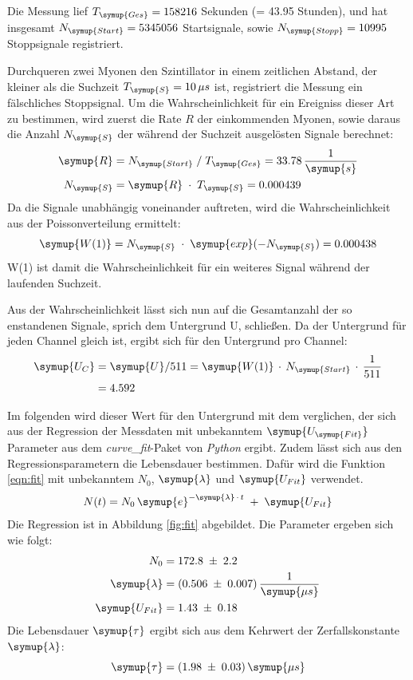 Die Messung lief $T_{\symup{Ges}}=158216$ Sekunden (= 43.95 Stunden), und hat insgesamt
$N_{\symup{Start}}=5345056$ Startsignale, sowie $N_{\symup{Stopp}}=10995$ Stoppsignale registriert.

\noindent
Durchqueren zwei Myonen den Szintillator in einem zeitlichen Abstand, der kleiner als die
Suchzeit $T_{\symup{S}}=10\,\mu s$ ist, registriert die Messung ein fälschliches Stoppsignal.
Um die Wahrscheinlichkeit für ein Ereigniss dieser Art zu bestimmen, wird zuerst die Rate $R$
der einkommenden Myonen, sowie daraus die Anzahl $N_{\symup{S}}$ der während der Suchzeit ausgelösten Signale
berechnet:
\begin{align*}
  \symup{R} &= N_{\symup{Start}}\;/\;T_{\symup{Ges}} = 33.78\,\frac{1}{\symup{s}}\\
  N_{\symup{S}} &= \symup{R}\;\cdot\;T_{\symup{S}} = 0.000439\\
\end{align*}
Da die Signale unabhängig voneinander auftreten, wird die Wahrscheinlichkeit aus der
Poissonverteilung ermittelt:
\begin{equation*}
  \symup{W(1)} = N_{\symup{S}}\;\cdot\;\symup{exp}(-N_{\symup{S}}) = 0.000438\\
\end{equation*}
W(1) ist damit die Wahrscheinlichkeit für ein weiteres Signal während der laufenden Suchzeit.

Aus der Wahrscheinlichkeit lässt sich nun auf die Gesamtanzahl der so enstandenen
Signale, sprich dem Untergrund U, schließen. Da der Untergrund für jeden Channel gleich ist,
ergibt sich für den Untergrund pro Channel:
\begin{align*}
  \symup{U_{C}} &= \symup{U}/511 = \symup{W(1)}\,\cdot\,N_{\symup{Start}}\,\cdot\,\frac{1}{511}\\
                &= 4.592
\end{align*}

Im folgenden wird dieser Wert für den Untergrund mit dem verglichen, der sich aus der Regression
der Messdaten mit unbekanntem $\symup{U_{\symup{Fit}}}$ Parameter aus dem \textit{curve\_fit}-Paket von \textit{Python} ergibt. Zudem lässt sich aus den Regressionsparametern die Lebensdauer bestimmen.
Dafür wird die Funktion \ref{eqn:fit} mit unbekanntem $N_{0}$, $\symup{\lambda}$ und $\symup{U_{Fit}}$ verwendet.
\begin{equation}
  N(t) = N_0\, \symup{e}^{-\symup{\lambda}\,\cdot\,t}\;+\;\symup{U_{Fit}}
  \label{eqn:fit}
\end{equation}
Die Regression ist in Abbildung \ref{fig:fit} abgebildet. Die Parameter ergeben sich wie folgt:
\begin{align*}
  N_0 &= 172.8\;\pm\;2.2\\
  \symup{\lambda} &= (0.506\;\pm\;0.007)\,\frac{1}{\symup{\mu s}}\\
  \symup{U_{Fit}} &= 1.43\;\pm\;0.18
\end{align*}
Die Lebensdauer $\symup{\tau}$ ergibt sich aus dem Kehrwert der Zerfallskonstante $\symup{\lambda}$:
\begin{equation*}
  \symup{\tau} = (1.98\;\pm\;0.03)\,\symup{\mu s}
\end{equation*}

